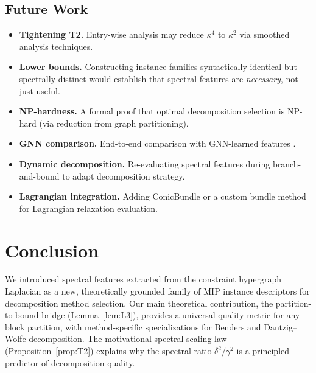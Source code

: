 \documentclass[12pt]{article}
\begin{document}
\subsection{Future Work}

\begin{itemize}
\item \textbf{Tightening T2.}  Entry-wise analysis may reduce $\kappa^4$
  to $\kappa^2$ via smoothed analysis techniques.

\item \textbf{Lower bounds.}  Constructing instance families syntactically
  identical but spectrally distinct would establish that spectral features
  are \emph{necessary}, not just useful.

\item \textbf{NP-hardness.}  A formal proof that optimal decomposition
  selection is NP-hard (via reduction from graph partitioning).

\item \textbf{GNN comparison.}  End-to-end comparison with GNN-learned
  features \citep{gasse2019exact}.

\item \textbf{Dynamic decomposition.}  Re-evaluating spectral features
  during branch-and-bound to adapt decomposition strategy.

\item \textbf{Lagrangian integration.}  Adding ConicBundle or a custom
  bundle method for Lagrangian relaxation evaluation.
\end{itemize}

\section{Conclusion}
\label{sec:conclusion}

We introduced spectral features extracted from the constraint hypergraph
Laplacian as a new, theoretically grounded family of MIP instance
descriptors for decomposition method selection.  Our main theoretical
contribution, the partition-to-bound bridge (Lemma~\ref{lem:L3}), provides
a universal quality metric for any block partition, with method-specific
specializations for Benders and Dantzig--Wolfe decomposition.  The
motivational spectral scaling law (Proposition~\ref{prop:T2}) explains why
the spectral ratio $\delta^2/\gamma^2$ is a principled predictor of
decomposition quality.
\end{document}
